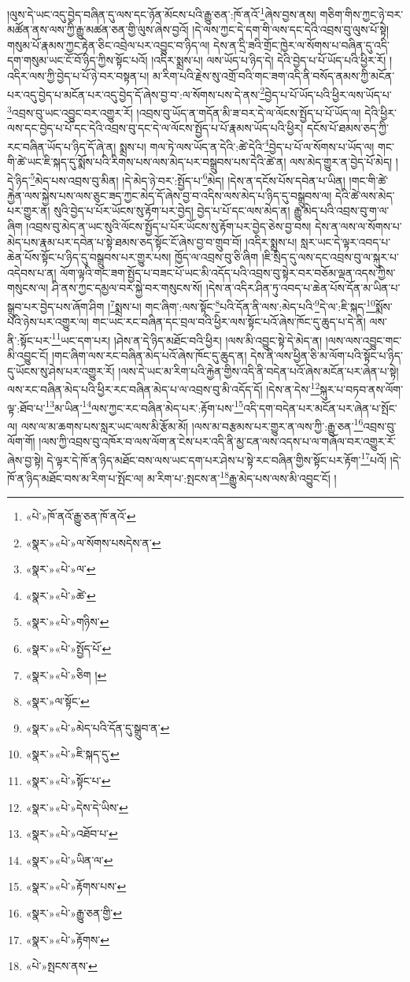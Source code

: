 །ལུས་དེ་ཡང་འདུ་བྱེད་བཞིན་དུ་ལས་དང་ཉོན་མོངས་པའི་རྒྱུ་ཅན་:ཁོ་ནའོ་\footnote{«པེ་»ཁོ་ནའོ་རྒྱུ་ཅན་ཁོ་ནའོ་}ཞེས་བྱས་ནས། གཅིག་གིས་ཀྱང་ཉེ་བར་མཚོན་ནས་ལས་ཀྱི་རྒྱུ་མཚན་ཅན་གྱི་ལུས་ཞེས་བྱའོ། །དེ་ལས་ཀྱང་དེ་དག་གི་ལས་དང་དེའི་འབྲས་བུ་ལུས་པོ་སྟེ། གསུམ་པོ་རྣམས་ཀྱང་རྟེན་ཅིང་འབྲེལ་པར་འབྱུང་བ་ཉིད་ལ། དེས་ན་དྲི་ཟའི་གྲོང་ཁྱེར་ལ་སོགས་པ་བཞིན་དུ་འདི་དག་གསུམ་ཡང་ངོ་བོ་ཉིད་ཀྱིས་སྟོང་པའོ། །འདིར་སྨྲས་པ། ལས་ཡོད་པ་ཉིད་དེ། དེའི་བྱེད་པ་པོ་ཡོད་པའི་ཕྱིར་རོ། །འདིར་ལས་ཀྱི་བྱེད་པ་པོ་ཉེ་བར་བསྟན་པ། མ་རིག་པའི་རྗེས་སུ་འགྲོ་བའི་གང་ཟག་འདི་ནི་བསོད་ནམས་ཀྱི་མངོན་པར་འདུ་བྱེད་པ་མངོན་པར་འདུ་བྱེད་དོ་ཞེས་བྱ་བ་:ལ་སོགས་པས་དེ་ནས་\footnote{«སྣར་»«པེ་»ལ་སོགས་པསདེས་ན་}བྱེད་པ་པོ་ཡོད་པའི་ཕྱིར་ལས་ཡོད་པ་\footnote{«སྣར་»«པེ་»ལ་}འབྲས་བུ་ཡང་འབྱུང་བར་འགྱུར་རོ། །འབྲས་བུ་ཡོད་ན་གདོན་མི་ཟ་བར་དེ་ལ་ལོངས་སྤྱོད་པ་པོ་ཡོད་ལ། དེའི་ཕྱིར་ལས་དང་བྱེད་པ་པོ་དང་དེའི་འབྲས་བུ་དང་དེ་ལ་ལོངས་སྤྱོད་པ་པོ་རྣམས་ཡོད་པའི་ཕྱིར། དངོས་པོ་ཐམས་ཅད་ཀྱི་རང་བཞིན་ཡོད་པ་ཉིད་དོ་ཞེ་ན། སྨྲས་པ། གལ་ཏེ་ལས་ཡོད་ན་དེའི་:ཚེ་དེའི་\footnote{«སྣར་»«པེ་»ཚེ་}བྱེད་པ་པོ་ལ་སོགས་པ་ཡོད་ལ། གང་གི་ཚེ་ཡང་ཇི་སྐད་དུ་སྨོས་པའི་རིགས་པས་ལས་མེད་པར་བསྒྲུབས་པས་དེའི་ཚེ་ན། ལས་མེད་གྱུར་ན་བྱེད་པོ་མེད། །དེ་ཉིད་\footnote{«སྣར་»«པེ་»གཉིས་}མེད་པས་འབྲས་བུ་མིན། །དེ་མེད་ཉེ་བར་:སྤྱོད་པ་\footnote{«སྣར་»«པེ་»སྤྱོད་པོ་}མེད། །དེས་ན་དངོས་པོས་དབེན་པ་ཡིན། །གང་གི་ཚེ་རྐྱེན་ལས་སྐྱེས་པས་ལས་ཅུང་ཟད་ཀྱང་མེད་དོ་ཞེས་བྱ་བ་འདིས་ལས་མེད་པ་ཉིད་དུ་བསྒྲུབས་ལ། དེའི་ཚེ་ལས་མེད་པར་གྱུར་ན། སུའི་བྱེད་པ་པོར་ཡོངས་སུ་རྟོག་པར་བྱེད། བྱེད་པ་པོ་དང་ལས་མེད་ན། རྒྱུ་མེད་པའི་འབྲས་བུ་ག་ལ་ཞིག །འབྲས་བུ་མེད་ན་ཡང་སུའི་ལོངས་སྤྱོད་པ་པོར་ཡོངས་སུ་རྟོག་པར་བྱེད་ཅེས་བྱ་བས། དེས་ན་ལས་ལ་སོགས་པ་མེད་པས་རྣམ་པར་དབེན་པ་སྟེ་ཐམས་ཅད་སྟོང་ངོ་ཞེས་བྱ་བ་གྲུབ་བོ། །འདིར་སྨྲས་པ། སླར་ཡང་དེ་ལྟར་འབད་པ་ཆེན་པོས་སྟོང་པ་ཉིད་དུ་བསྒྲུབས་པར་གྱུར་པས། ཁྱོད་ལ་འབྲས་བུ་ཅི་ཞིག །ཇི་སྲིད་དུ་ལས་དང་འབྲས་བུ་ལ་སྐུར་པ་འདེབས་པ་ན། ལོག་ལྟའི་གང་ཟག་སྤྱོད་པ་བཟང་པོ་ཡང་མི་འདོད་པའི་འབྲས་བུ་སྟེར་བར་བཅོམ་ལྡན་འདས་ཀྱིས་གསུངས་ལ། ཤི་ནས་ཀྱང་དམྱལ་བར་སྐྱེ་བར་གསུངས་སོ། །དེས་ན་འདིར་ཤིན་ཏུ་འབད་པ་ཆེན་པོས་དོན་མ་ཡིན་པ་སྒྲུབ་པར་བྱེད་པས་ཞོག་ཤིག །\footnote{«སྣར་»«པེ་»ཅིག །}སྨྲས་པ། གང་ཞིག་:ལས་སྟོང་\footnote{«སྣར་»ལ་སྟོང་}པའི་དོན་ནི་ལས་:མེད་པའི་\footnote{«སྣར་»«པེ་»མེད་པའི་དོན་དུ་སྒྲུབ་ན་}དེ་ལ་:ཇི་སྐད་\footnote{«སྣར་»«པེ་»ཇི་སྐད་དུ་}སྨོས་པའི་ཉེས་པར་འགྱུར་ལ། གང་ཡང་རང་བཞིན་དང་བྲལ་བའི་ཕྱིར་ལས་སྟོང་པའོ་ཞེས་ཁོང་དུ་ཆུད་པ་དེ་ནི། ལས་ནི་:སྟོང་པར་\footnote{«སྣར་»«པེ་»སྟོང་པ་}ཡང་དག་པར། །ཤེས་ན་དེ་ཉིད་མཐོང་བའི་ཕྱིར། །ལས་མི་འབྱུང་སྟེ་དེ་མེད་ན། །ལས་ལས་འབྱུང་གང་མི་འབྱུང་ངོ། །གང་ཞིག་ལས་རང་བཞིན་མེད་པའོ་ཞེས་ཁོང་དུ་ཆུད་ན། དེས་ནི་ལས་ཕྱིན་ཅི་མ་ལོག་པའི་སྟོང་པ་ཉིད་དུ་ཡོངས་སུ་ཤེས་པར་འགྱུར་རོ། །ལས་དེ་ཡང་མ་རིག་པའི་རྐྱེན་གྱིས་འདི་ནི་བདེན་པའོ་ཞེས་མངོན་པར་ཞེན་པ་སྟེ། ལས་རང་བཞིན་མེད་པའི་ཕྱིར་རང་བཞིན་མེད་པ་ལ་འབྲས་བུ་མི་འདོད་དོ། །དེས་ན་དེས་\footnote{«སྣར་»«པེ་»དེས་དེ་ཡིས་}སྐུར་པ་བཏབ་ནས་ལོག་ལྟ་:ཐོབ་པ་\footnote{«སྣར་»«པེ་»འཐོབ་པ་}མ་ཡིན་\footnote{«སྣར་»«པེ་»ཡིན་ལ་}ལས་ཀྱང་རང་བཞིན་མེད་པར་:རྟོག་པས་\footnote{«སྣར་»«པེ་»རྟོགས་པས་}འདི་དག་བདེན་པར་མངོན་པར་ཞེན་པ་སྤོང་ལ། ལས་ལ་མ་ཆགས་པས་སླར་ཡང་ལས་མི་རྩོམ་མོ། །ལས་མ་བརྩམས་པར་གྱུར་ན་ལས་ཀྱི་:རྒྱུ་ཅན་\footnote{«སྣར་»«པེ་»རྒྱུ་ཅན་གྱི་}འབྲས་བུ་ལོག་གོ། །ལས་ཀྱི་འབྲས་བུ་འཁོར་བ་ལས་ལོག་ན་ངེས་པར་འདི་ནི་མྱ་ངན་ལས་འདས་པ་ལ་གཞོལ་བར་འགྱུར་རོ་ཞེས་བྱ་སྟེ། དེ་ལྟར་དེ་ཁོ་ན་ཉིད་མཐོང་བས་ལས་ཡང་དག་པར་ཤེས་པ་སྟེ་རང་བཞིན་གྱིས་སྟོང་པར་རྟོག་\footnote{«སྣར་»«པེ་»རྟོགས་}པའོ། །དེ་ཁོ་ན་ཉིད་མཐོང་བས་མ་རིག་པ་སྤོང་ལ། མ་རིག་པ་:སྤངས་ན་\footnote{«པེ་»སྤངས་ནས་}རྒྱུ་མེད་པས་ལས་མི་འབྱུང་ངོ། །
